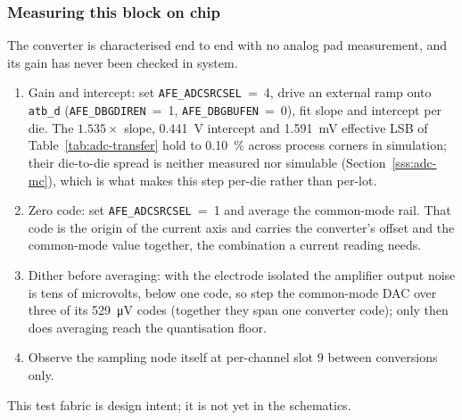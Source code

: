 %

\subsubsection{Measuring this block on chip}

The converter is characterised end to end with no analog pad measurement,
and its gain has never been checked in system.
\begin{enumerate}[nosep]
\item Gain and intercept: set \texttt{AFE\_ADCSRCSEL}~=~4, drive an external
  ramp onto \texttt{atb\_d} (\texttt{AFE\_DBGDIREN}~=~1,
  \texttt{AFE\_DBGBUFEN}~=~0), fit slope and intercept per die. The
  \(1.535\times\) slope, \SI{0.441}{\volt} intercept and
  \SI{1.591}{\milli\volt} effective LSB of Table~\ref{tab:adc-transfer} hold
  to \SI{0.10}{\percent} across process corners in simulation; their
  die-to-die spread is neither measured nor simulable
  (Section~\ref{sss:adc-mc}), which is what makes this step per-die rather
  than per-lot.
\item Zero code: set \texttt{AFE\_ADCSRCSEL}~=~1 and average the common-mode
  rail. That code is the origin of the current axis and carries the
  converter's offset and the common-mode value together, the combination a
  current reading needs.
\item Dither before averaging: with the electrode isolated the amplifier
  output noise is tens of microvolts, below one code, so step the common-mode
  DAC over three of its \SI{529}{\micro\volt} codes (together they span one
  converter code); only then does averaging reach the quantisation floor.
\item Observe the sampling node itself at per-channel slot 9 between
  conversions only.
\end{enumerate}
This test fabric is design intent; it is not yet in the schematics.
